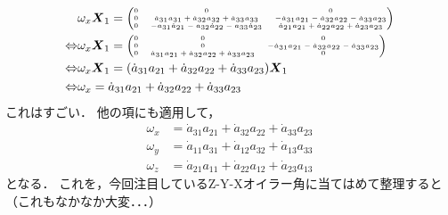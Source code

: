 \begin{align}
  & \omega_{x} \boldsymbol{X}_1 =
  {\tiny \begin{pmatrix}
      0 & 0 & 0\\
      0 & \dot{a}_{31} a_{31} + \dot{a}_{32} a_{32} + \dot{a}_{33} a_{33} & - \dot{a}_{31} a_{21} - \dot{a}_{32} a_{22} - \dot{a}_{33} a_{23}\\
      0 & - a_{31} \dot{a}_{21} - a_{32} \dot{a}_{22} - a_{33} \dot{a}_{23} & \dot{a}_{21} a_{21} + \dot{a}_{22} a_{22} + \dot{a}_{23} a_{23}
  \end{pmatrix}}\\
  \Leftrightarrow & \omega_{x} \boldsymbol{X}_1 =
  {\tiny
    \begin{pmatrix}
      0 & 0 & 0\\
      0 & 0 & - \dot{a}_{31} a_{21} - \dot{a}_{32} a_{22} - \dot{a}_{33} a_{23}\\
      0 & \dot{a}_{31} a_{21} + \dot{a}_{32} a_{22} + \dot{a}_{33} a_{23} & 0
  \end{pmatrix}}\\
  \Leftrightarrow &
  \omega_{x} \boldsymbol{X}_1 =
  (\dot{a}_{31} a_{21} + \dot{a}_{32} a_{22} + \dot{a}_{33} a_{23}) \boldsymbol{X}_1\\
  \Leftrightarrow & \omega_{x} = \dot{a}_{31} a_{21} + \dot{a}_{32} a_{22} + \dot{a}_{33} a_{23}
\end{align}
これはすごい．
他の項にも適用して，
\begin{align}
  \omega_{x} &= \dot{a}_{31} a_{21} + \dot{a}_{32} a_{22} + \dot{a}_{33} a_{23}\\
  \omega_{y} &= \dot{a}_{11} a_{31} + \dot{a}_{12} a_{32} + \dot{a}_{13} a_{33}\\
  \omega_{z} &= \dot{a}_{21} a_{11} + \dot{a}_{22} a_{12} + \dot{a}_{23} a_{13}
\end{align}
となる．
これを，今回注目しているZ-Y-Xオイラー角に当てはめて整理すると（これもなかなか大変．．．）
